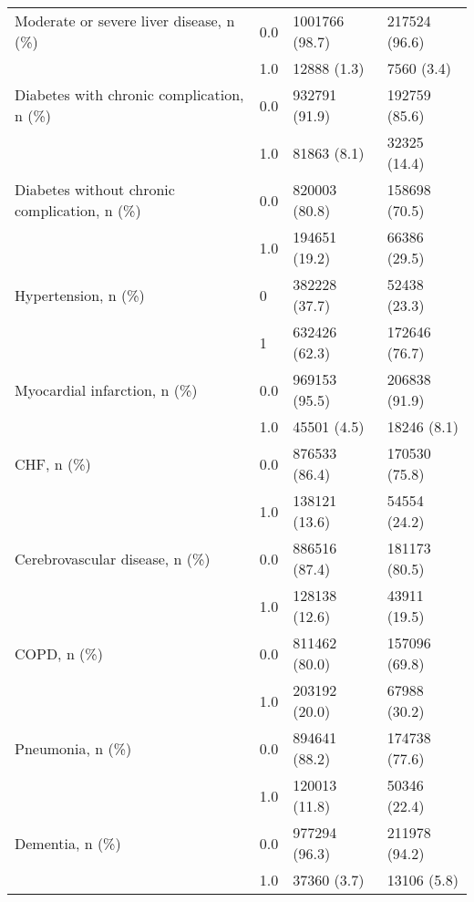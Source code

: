 \begin{tabular}{llll}
Moderate or severe liver disease, n (\%) & 0.0 &                 1001766 (98.7) &     217524 (96.6) \\
                                       & 1.0 &                    12888 (1.3) &        7560 (3.4) \\
Diabetes with chronic complication, n (\%) & 0.0 &                  932791 (91.9) &     192759 (85.6) \\
                                       & 1.0 &                    81863 (8.1) &      32325 (14.4) \\
Diabetes without chronic complication, n (\%) & 0.0 &                  820003 (80.8) &     158698 (70.5) \\
                                       & 1.0 &                  194651 (19.2) &      66386 (29.5) \\
Hypertension, n (\%) & 0 &                  382228 (37.7) &      52438 (23.3) \\
                                       & 1 &                  632426 (62.3) &     172646 (76.7) \\
Myocardial infarction, n (\%) & 0.0 &                  969153 (95.5) &     206838 (91.9) \\
                                       & 1.0 &                    45501 (4.5) &       18246 (8.1) \\
CHF, n (\%) & 0.0 &                  876533 (86.4) &     170530 (75.8) \\
                                       & 1.0 &                  138121 (13.6) &      54554 (24.2) \\
Cerebrovascular disease, n (\%) & 0.0 &                  886516 (87.4) &     181173 (80.5) \\
                                       & 1.0 &                  128138 (12.6) &      43911 (19.5) \\
COPD, n (\%) & 0.0 &                  811462 (80.0) &     157096 (69.8) \\
                                       & 1.0 &                  203192 (20.0) &      67988 (30.2) \\
Pneumonia, n (\%) & 0.0 &                  894641 (88.2) &     174738 (77.6) \\
                                       & 1.0 &                  120013 (11.8) &      50346 (22.4) \\
Dementia, n (\%) & 0.0 &                  977294 (96.3) &     211978 (94.2) \\
                                       & 1.0 &                    37360 (3.7) &       13106 (5.8) \\

\end{tabular}
